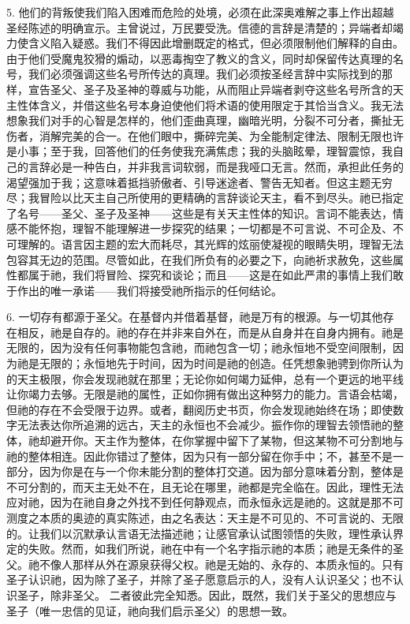5. 他们的背叛使我们陷入困难而危险的处境，必须在此深奥难解之事上作出超越圣经陈述的明确宣示。主曾说过，万民要受洗。信德的言辞是清楚的；异端者却竭力使含义陷入疑惑。我们不得因此增删既定的格式，但必须限制他们解释的自由。由于他们受魔鬼狡猾的煽动，以恶毒掏空了教义的含义，同时却保留传达真理的名号，我们必须强调这些名号所传达的真理。我们必须按圣经言辞中实际找到的那样，宣告圣父、圣子及圣神的尊威与功能，从而阻止异端者剥夺这些名号所含的天主性体含义，并借这些名号本身迫使他们将术语的使用限定于其恰当含义。我无法想象我们对手的心智是怎样的，他们歪曲真理，幽暗光明，分裂不可分者，撕扯无伤者，消解完美的合一。在他们眼中，撕碎完美、为全能制定律法、限制无限也许是小事；至于我，回答他们的任务使我充满焦虑；我的头脑眩晕，理智震惊，我自己的言辞必是一种告白，并非我言词软弱，而是我哑口无言。然而，承担此任务的渴望强加于我；这意味着抵挡骄傲者、引导迷途者、警告无知者。但这主题无穷尽；我冒险以比天主自己所使用的更精确的言辞谈论天主，看不到尽头。祂已指定了名号——圣父、圣子及圣神——这些是有关天主性体的知识。言词不能表达，情感不能怀抱，理智不能理解进一步探究的结果；一切都是不可言说、不可企及、不可理解的。语言因主题的宏大而耗尽，其光辉的炫丽使凝视的眼睛失明，理智无法包容其无边的范围。尽管如此，在我们所负有的必要之下，向祂祈求赦免，这些属性都属于祂，我们将冒险、探究和谈论；而且——这是在如此严肃的事情上我们敢于作出的唯一承诺——我们将接受祂所指示的任何结论。\par

6. 一切存有都源于圣父。在基督内并借着基督，祂是万有的根源。与一切其他存在相反，祂是自存的。祂的存在并非来自外在，而是从自身并在自身内拥有。祂是无限的，因为没有任何事物能包含祂，而祂包含一切；祂永恒地不受空间限制，因为祂是无限的；永恒地先于时间，因为时间是祂的创造。任凭想象驰骋到你所认为的天主极限，你会发现祂就在那里；无论你如何竭力延伸，总有一个更远的地平线让你竭力去够。无限是祂的属性，正如你拥有做出这种努力的能力。言语会枯竭，但祂的存在不会受限于边界。或者，翻阅历史书页，你会发现祂始终在场；即使数字无法表达你所追溯的远古，天主的永恒也不会减少。振作你的理智去领悟祂的整体，祂却避开你。天主作为整体，在你掌握中留下了某物，但这某物不可分割地与祂的整体相连。因此你错过了整体，因为只有一部分留在你手中；不，甚至不是一部分，因为你是在与一个你未能分割的整体打交道。因为部分意味着分割，整体是不可分割的，而天主无处不在，且无论在哪里，祂都是完全临在。因此，理性无法应对祂，因为在祂自身之外找不到任何静观点，而永恒永远是祂的。这就是那不可测度之本质的奥迹的真实陈述，由之名表达：天主是不可见的、不可言说的、无限的。让我们以沉默承认言语无法描述祂；让感官承认试图领悟的失败，理性承认界定的失败。然而，如我们所说，祂在中有一个名字指示祂的本质；祂是无条件的圣父。祂不像人那样从外在源泉获得父权。祂是无始的、永存的、本质永恒的。只有圣子认识祂，因为除了圣子，并除了圣子愿意启示的人，没有人认识圣父；也不认识圣子，除非圣父。 二者彼此完全知悉。因此，既然，我们关于圣父的思想应与圣子（唯一忠信的见证，祂向我们启示圣父）的思想一致。\par

